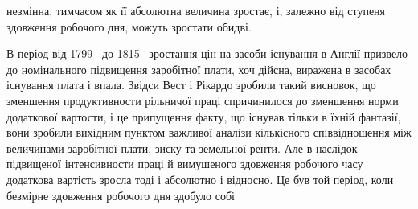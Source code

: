\parcont{}  %
незмінна, тимчасом як її абсолютна величина зростає, і, залежно
від ступеня здовження робочого дня, можуть зростати обидві.

В період від 1799~ до 1815~ зростання цін на засоби існування
в Англії призвело до номінального підвищення заробітної
плати, хоч дійсна, виражена в засобах існування плата і впала.
Звідси Вест і Рікардо зробили такий висновок, що зменшення
продуктивности рільничої праці спричинилося до зменшення
норми додаткової вартости, і це припущення факту, що існував
тільки в їхній фантазії, вони зробили вихідним пунктом важливої
аналізи кількісного співвідношення між величинами заробітної
плати, зиску та земельної ренти. Але в наслідок підвищеної
інтенсивности праці й вимушеного здовження робочого часу
додаткова вартість зросла тоді і абсолютно і відносно. Це був
той період, коли безмірне здовження робочого дня здобуло собі
